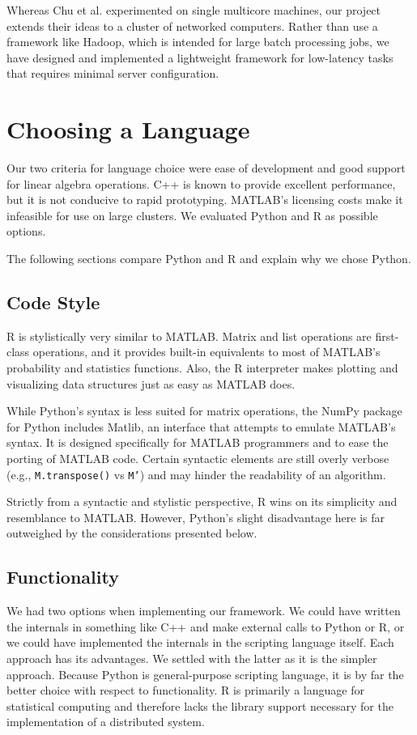 \documentclass[%
  final,
  notitlepage,
  narroweqnarray,
  inline,
]{ieee}
\begin{document}
Whereas Chu et al. experimented on single multicore machines, our project
extends their ideas to a cluster of networked computers. Rather than use a
framework like Hadoop, which is intended for large batch processing jobs, we
have designed and implemented a lightweight framework for low-latency tasks
that requires minimal server configuration.

\section{Choosing a Language}

Our two criteria for language choice were ease of development and good support
for linear algebra operations. C++ is known to provide excellent performance,
but it is not conducive to rapid prototyping. MATLAB's licensing costs make it
infeasible for use on large clusters. We evaluated Python and R as possible
options.

The following sections compare Python and R and explain why we chose Python.

\subsection{Code Style}

R is stylistically very similar to MATLAB. Matrix and list operations are
first-class operations, and it provides built-in equivalents to most of
MATLAB's probability and statistics functions. Also, the R interpreter makes
plotting and visualizing data structures just as easy as MATLAB does.

While Python's syntax is less suited for matrix operations, the NumPy
package~\cite{numpy} for Python includes Matlib, an interface that attempts to
emulate MATLAB's syntax. It is designed specifically for MATLAB programmers and
to ease the porting of MATLAB code. Certain syntactic elements are still overly
verbose (e.g., \texttt{M.transpose()} vs \texttt{M'}) and may hinder the
readability of an algorithm.

Strictly from a syntactic and stylistic perspective, R wins on its simplicity
and resemblance to MATLAB. However, Python's slight disadvantage here is far
outweighed by the considerations presented below.

\subsection{Functionality}

We had two options when implementing our framework. We could have written the
internals in something like C++ and make external calls to Python or R, or we
could have implemented the internals in the scripting language itself. Each
approach has its advantages. We settled with the latter as it is the simpler
approach. Because Python is general-purpose scripting language, it is by far
the better choice with respect to functionality. R is primarily a language for
statistical computing and therefore lacks the library support necessary for the
implementation of a distributed system.
\end{document}
